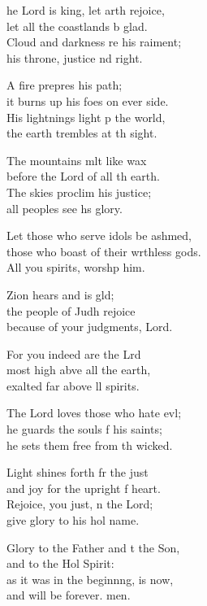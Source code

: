 \begin{psalmverse}
  \begin{patverse}
    he Lord is king, let arth rejoice,\Med\\
let all the coastlands b glad.\\
Cloud and darkness re his raiment;\Med\\
his throne, justice nd right.

A fire prepres his path;\Med\\
it burns up his foes on ever side.\\
His lightnings light p the world,\Med\\
the earth trembles at th sight.

The mountains mlt like wax\Med\\
before the Lord of all th earth.\\
The skies proclim his justice;\Med\\
all peoples see h\pointup{\i}s glory.

Let those who serve idols be ashmed,\Flex\\
those who boast of their wrthless gods.\Med\\
All you spirits, worsh\pointup{\i}p him.

Zion hears and is gld;\Flex\\
the people of Judh rejoice\Med\\
because of your judgments,  Lord.

For you indeed are the Lrd\Flex\\
most high abve all the earth,\Med\\
exalted far above ll spirits.

The Lord loves those who hate ev\pointup{\i}l;\Flex\\
he guards the souls f his saints;\Med\\
he sets them free from th wicked.

Light shines forth fr the just\Med\\
and joy for the upright f heart.\\
Rejoice, you just, \pointup{\i}n the Lord;\Med\\
give glory to his hol name.

Glory to the Father and t the Son,\Med\\
and to the Hol Spirit:\\
as it was in the beginn\pointup{\i}ng, is now,\Med\\
and will be forever. men.
  \end{patverse}
\end{psalmverse}
